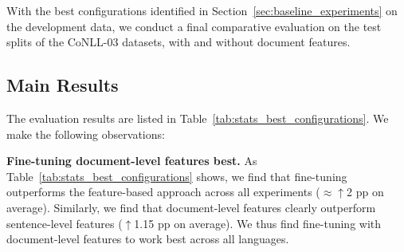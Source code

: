 \documentclass[11pt,a4paper]{article}
\begin{document}
With the best configurations identified in Section~\ref{sec:baseline_experiments} on the development data,    
we conduct a final comparative evaluation on the test splits of the CoNLL-03 datasets, with and without document features.







\subsection{Main Results}

\vspace{-1mm}
The evaluation results are listed in Table~\ref{tab:stats_best_configurations}. We make the following observations:
 



\begin{table}
\centering
{}
\vspace{-2mm}
\caption{Relative change in F1 for different entity types and languages when adding document-level features.}
\label{tab:comparison_context_vs_no_context}
\vspace{-2mm}
\end{table}


\noindent
\textbf{Fine-tuning document-level features best.} As Table~\ref{tab:stats_best_configurations} shows, we find that fine-tuning outperforms the feature-based approach across all experiments ($\approx \uparrow$2 pp on average). 
Similarly, we find that document-level features clearly outperform sentence-level features ($\uparrow$1.15 pp on average). We thus find fine-tuning with document-level features to work best across all languages. 
\end{document}

